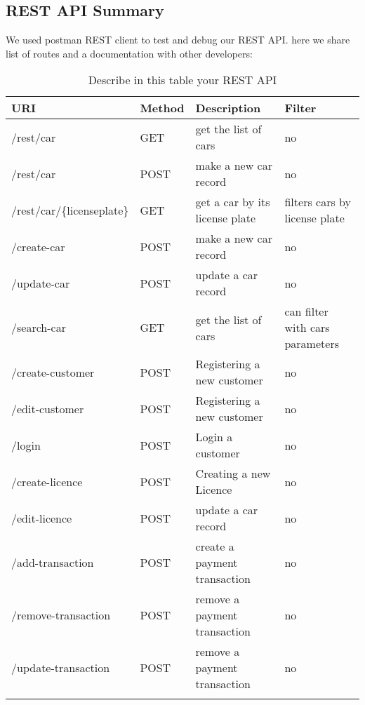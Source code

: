 \subsection{REST API Summary}

We used postman REST client to test and debug our REST API. here we share list of routes and a documentation with other developers: 

\begin{longtable}{|p{}|p{} |p{}|p{}|} 
\hline
\textbf{URI} & \textbf{Method} & \textbf{Description} & \textbf{Filter} \\\hline

/rest/car & GET &  get the list of cars & no \\\hline

/rest/car & POST &  make a new car record & no \\\hline

/rest/car/\{licenseplate\} & GET &  get a car by its license plate & filters cars by license plate \\\hline

/create-car & POST &  make a new car record & no \\\hline

/update-car & POST &  update a car record & no \\\hline

/search-car & GET &  get the list of cars & can filter with cars parameters \\\hline

/create-customer & POST &  Registering a new customer & no \\\hline

/edit-customer & POST &  Registering a new customer & no \\\hline

/login & POST &  Login a customer & no \\\hline

/create-licence & POST &  Creating a new Licence & no \\\hline

/edit-licence & POST &  update a car record & no \\\hline

/add-transaction & POST &  create a payment transaction & no \\\hline

/remove-transaction & POST &  remove a payment transaction & no \\\hline

/update-transaction & POST &  remove a payment transaction & no \\\hline


\caption{Describe in this table your REST API}
\label{tab:termGlossary}
\end{longtable}